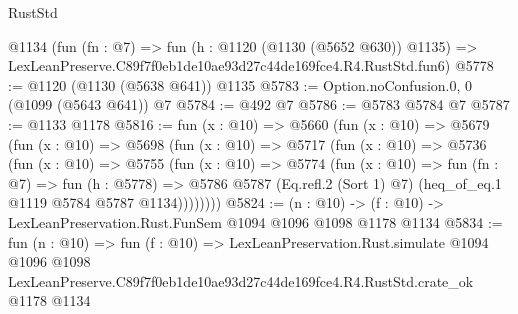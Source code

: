 \begin{lexlean}{RustStd}
\begin{coremodule}
    @1134
    (fun (fn : @7) =>
    fun (h : @1120 (@1130 (@5652 @630)) @1135) =>
    LexLeanPreserve.C89f7f0eb1de10ae93d27c44de169fce4.R4.RustStd.fun6)
@5778 := @1120 (@1130 (@5638 @641)) @1135
@5783 := Option.noConfusion.{0, 0} (@1099 (@5643 @641)) @7
@5784 := @492 @7
@5786 := @5783 @5784 @7
@5787 := @1133 @1178
@5816 := fun (x : @10) =>
  @5660
    (fun (x : @10) =>
    @5679
      (fun (x : @10) =>
      @5698
        (fun (x : @10) =>
        @5717
          (fun (x : @10) =>
          @5736
            (fun (x : @10) =>
            @5755
              (fun (x : @10) =>
              @5774
                (fun (x : @10) =>
                fun (fn : @7) =>
                fun (h : @5778) =>
                @5786 @5787 (Eq.refl.{2} (Sort 1) @7) (heq_of_eq.{1} @1119 @5784 @5787 @1134))))))))
@5824 := (n : @10) -> (f : @10) -> LexLeanPreservation.Rust.FunSem @1094 @1096 @1098 @1178 @1134
@5834 := fun (n : @10) =>
  fun (f : @10) =>
  LexLeanPreservation.Rust.simulate
    @1094
    @1096
    @1098
    LexLeanPreserve.C89f7f0eb1de10ae93d27c44de169fce4.R4.RustStd.crate_ok
    @1178
    @1134
\end{coremodule}
\end{lexlean}
